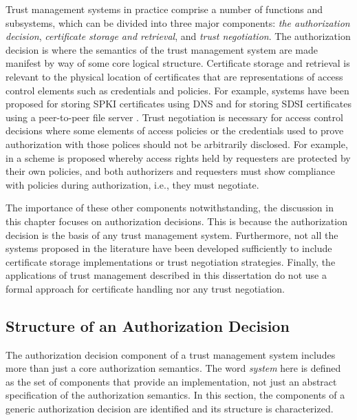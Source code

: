 Trust management systems in practice comprise a number of functions and subsystems, which can be
divided into three major components: \emph{the authorization decision}, \emph{certificate 
storage and retrieval}, and \emph{trust negotiation}. The authorization decision is where the
semantics of the trust management system are made manifest by way of some core logical
structure. Certificate storage and retrieval is relevant to the physical location of
certificates that are representations of access control elements such as credentials and
policies. For example, systems have been proposed for storing SPKI certificates using DNS
\cite{nikander98storing} and for storing SDSI certificates using a peer-to-peer file server
\cite{ajmani02conchord}. Trust negotiation
\cite{Winsborough:ATN,Yu:PECSATNI,Seamons:LDACPATN,Yu:ISATN,Winsborough:TPATN,Winsborough:SATN}
is necessary for access control decisions where some elements of access policies or the
credentials used to prove authorization with those polices should not be arbitrarily disclosed.
For example, in \cite{Winsborough:ATN} a scheme is proposed whereby access rights held by
requesters are protected by their own policies, and both authorizers and requesters must show
compliance with policies during authorization, i.e., they must negotiate.

The importance of these other components notwithstanding, the discussion in this chapter focuses
on authorization decisions. This is because the authorization decision is the basis of any trust
management system. Furthermore, not all the systems proposed in the literature have been
developed sufficiently to include certificate storage implementations or trust negotiation
strategies. Finally, the applications of trust management described in this dissertation do not
use a formal approach for certificate handling nor any trust negotiation.

\subsection{Structure of an Authorization Decision}
\label{section-components-structure}

The authorization decision component of a trust management system includes more than just a core
authorization semantics. The word \emph{system} here is defined as the set of components that provide an
implementation, not just an abstract specification of the authorization semantics. In this
section, the components of a generic authorization decision are identified and its
structure is characterized.


